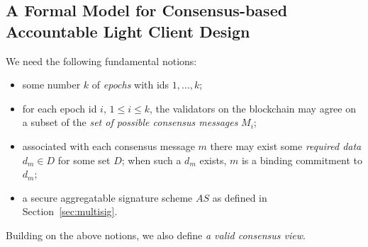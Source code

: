 \begin{comment}
\noindent Depending on the adversarial model, we have two cases as well. The first security model assumes that at least $t'$ validators 
in each validator set are honest, hence there cannot be a collusion between the possibly malicious prover and the honest validators reaching 
consensus on the blockchain. In turn, this implies that \textit{soundness} suffices as a security property, i.e., the prover should not be able to 
wrongly convince the verifier that consensus has been reached on any event or message outside of some small probability. The second security 
model strengthens the adversarial capability by not making any assumption regarding the fraction of honest validators in at least one of the validator 
sets. Hence a stronger security property is needed. We call it \textit{accountability}. This captures the intuition that if the light client is convinced of 
something that the blockchain did not achieve consensus on, and if the light client and prover's communication transcript is made public, then using 
it and other public information, it should be possible to identify an epoch and a number of dishonest validators equal to at least the total number of validators in 
that epoch minus $t'$.
\end{comment}

\subsection{A Formal Model for Consensus-based Accountable Light Client Design}
\label{sec:LCformal_model}

\noindent We need the following fundamental notions:

\begin{itemize}
\item some number $k$ of \textit{epochs} with ids $1,\dots, k$;
\item for each epoch id $i$, $1 \leq i \leq k$, the validators on the blockchain may agree on a subset of the \textit{set of possible consensus messages} $M_i$;
\item associated with each consensus message $m$ there may exist some \textit{required data} $d_{m} \in D$ for some set $D$; 
when such a $d_m$ exists, $m$ is a binding commitment to $d_m$; 
\item a secure aggregatable signature scheme $\mathit{AS}$ as defined in Section~\ref{sec:multisig}.
\end{itemize}

\noindent Building on the above notions, we also define \textit{a valid consensus view}. 

